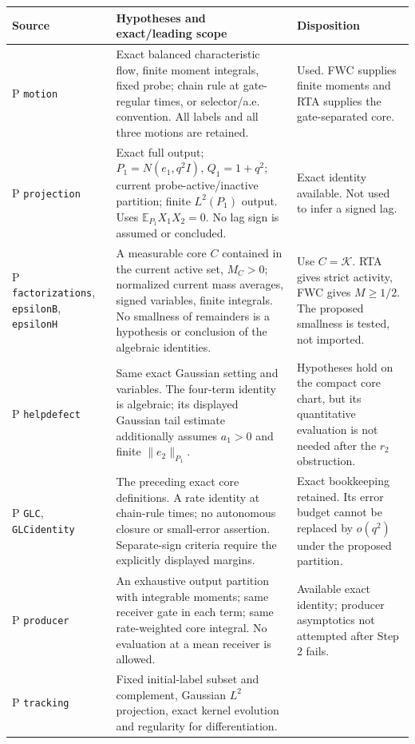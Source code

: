 \documentclass[11pt]{article}
\newcommand{\K}{\mathcal K}
\newcommand{\E}{\mathbb E}
\begin{document}
\small
\begin{longtable}{>{\raggedright\arraybackslash}p{}
 >{\raggedright\arraybackslash}p{}
 >{\raggedright\arraybackslash}p{}}
\toprule Source & Hypotheses and exact/leading scope & Disposition\\
\midrule\endhead
P \texttt{motion}
& Exact balanced characteristic flow, finite moment integrals, fixed
 probe; chain rule at gate-regular times, or selector/a.e. convention.
 All labels and all three motions are retained.
& Used. FWC supplies finite moments and RTA supplies the
 gate-separated core.\\
P \texttt{projection}
& Exact full output; \(P_1=N(e_1,q^2I)\), \(Q_1=1+q^2\);
 current probe-active/inactive partition; finite \(L^2(P_1)\) output.
 Uses \(\E_{P_1}X_1X_2=0\). No lag sign is assumed or concluded.
& Exact identity available. Not used to infer a signed lag.\\
P \texttt{factorizations}, \texttt{epsilonB}, \texttt{epsilonH}
& A measurable core \(C\) contained in the current active set,
 \(M_C>0\); normalized current mass averages, signed variables,
 finite integrals. No smallness of remainders is a hypothesis or
 conclusion of the algebraic identities.
& Use \(C=\K\). RTA gives strict activity, FWC gives \(M\ge1/2\).
 The proposed smallness is tested, not imported.\\
P \texttt{helpdefect}
& Same exact Gaussian setting and variables. The four-term identity
 is algebraic; its displayed Gaussian tail estimate additionally
 assumes \(a_1>0\) and finite \(\|e_2\|_{P_1}\).
& Hypotheses hold on the compact core chart, but its quantitative
 evaluation is not needed after the \(r_2\) obstruction.\\
P \texttt{GLC}, \texttt{GLCidentity}
& The preceding exact core definitions. A rate identity at
 chain-rule times; no autonomous closure or small-error assertion.
 Separate-sign criteria require the explicitly displayed margins.
& Exact bookkeeping retained. Its error budget cannot be replaced
 by \(o(q^2)\) under the proposed partition.\\
P \texttt{producer}
& An exhaustive output partition with integrable moments;
 same receiver gate in each term; same rate-weighted core integral.
 No evaluation at a mean receiver is allowed.
& Available exact identity; producer asymptotics not attempted
 after Step 2 fails.\\
P \texttt{tracking}
& Fixed initial-label subset and complement, Gaussian \(L^2\)
 projection, exact kernel evolution and regularity for differentiation.

\end{longtable}
\end{document}
